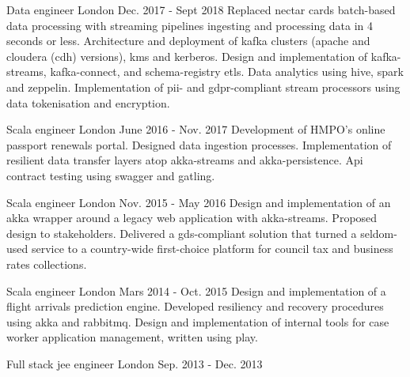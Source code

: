 \begin{cventries}
  \cventry
    {Data engineer} %
    {} %
    {London} %
    {Dec. 2017 - Sept 2018} %
    {} %
    {
Replaced nectar cards batch-based data processing with streaming pipelines ingesting and processing data in 4 seconds or less.
Architecture and deployment of kafka clusters (apache and cloudera (cdh) versions), kms and kerberos. 
Design and implementation of kafka-streams, kafka-connect, and schema-registry etls. Data analytics using hive, spark and zeppelin.
Implementation of pii- and gdpr-compliant stream processors using data tokenisation and encryption.
    }

  \cventry
    {Scala engineer} %
    {} %
    {London} %
    {June 2016 - Nov. 2017} %
    {} %
    {
Development of HMPO's online passport renewals portal. Designed data ingestion processes.
Implementation of resilient data transfer layers atop akka-streams and akka-persistence.
Api contract testing using swagger and gatling.
    }

  \cventry
    {Scala engineer} %
    {} %
    {London} %
    {Nov. 2015 - May 2016} %
    {} %
    {
Design and implementation of an akka wrapper around a legacy web application with akka-streams. Proposed design to stakeholders.
Delivered a gds-compliant solution that turned a seldom-used service to a country-wide first-choice platform for council tax and business rates collections.
    }

  \cventry
    {Scala engineer} %
    {} %
    {London} %
    {Mars 2014 - Oct. 2015} %
    {} %
    {
Design and implementation of a flight arrivals prediction engine. Developed resiliency and recovery procedures using akka and rabbitmq.
Design and implementation of internal tools for case worker application management, written using play.
    }

  \cventry
    {Full stack jee engineer} %
    {} %
    {London} %
    {Sep. 2013 - Dec. 2013} %
    {}
    {}


\end{cventries}
